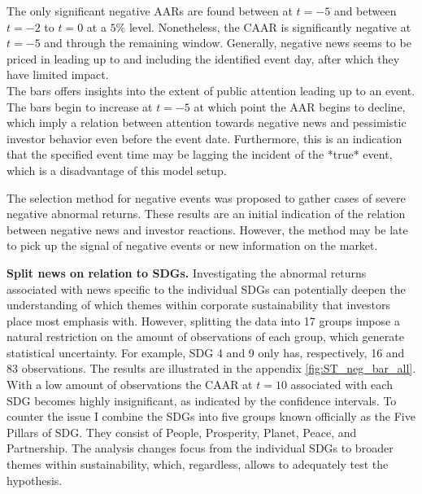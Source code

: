The only significant negative AARs are found between at $t=-5$ and between $t=-2$ to $t=0$ at a $5\%$ level. Nonetheless, the CAAR is significantly negative at $t=-5$ and through the remaining window. Generally, negative news seems to be priced in leading up to and including the identified event day, after which they have limited impact. \\ 

The bars offers insights into the extent of public attention leading up to an event. The bars begin to increase at $t=-5$ at which point the AAR begins to decline, which imply a relation between attention towards negative news and pessimistic investor behavior even before the event date. Furthermore, this is an indication that the specified event time may be lagging the incident of the *true* event, which is a disadvantage of this model setup.  

The selection method for negative events was proposed to gather cases of severe negative abnormal returns. These results are an initial indication of the relation between negative news and investor reactions. However, the method may be late to pick up the signal of negative events or new information on the market.  


\noindent \textbf{Split news on relation to SDGs.} Investigating the abnormal returns associated with news specific to the individual SDGs can potentially deepen the understanding of which themes within corporate sustainability that investors place most emphasis with. However, splitting the data into 17 groups impose a natural restriction on the amount of observations of each group, which generate statistical uncertainty. For example, SDG 4 and 9 only has, respectively, 16 and 83 observations. The results are illustrated in the appendix \ref{fig:ST_neg_bar_all}. With a low amount of observations the CAAR at $t = 10$ associated with each SDG becomes highly insignificant, as indicated by the confidence intervals. To counter the issue I combine the SDGs into five groups known officially as the Five Pillars of SDG. They consist of People, Prosperity, Planet, Peace, and Partnership. The analysis changes focus from the individual SDGs to broader themes within sustainability, which, regardless, allows to adequately test the hypothesis.

